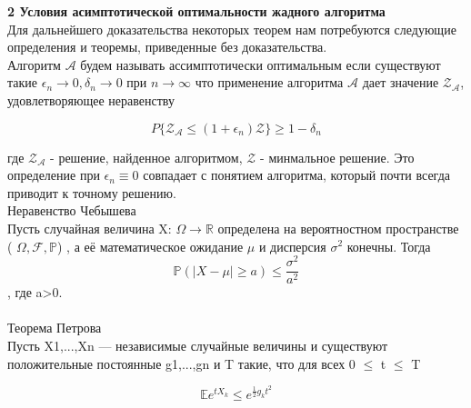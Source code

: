 \documentclass[a4paper, 14pt]{extarticle}
\begin{document}
\newcommand{\algorithm}{$\mathcal{A'}$}
\newcommand{\topboundE}{$\mathcal{Z^*_{A'}}$}
\newcommand{\topboundD}{$\mathcal{D^*_{A'}}$}
\newcommand{\randomvalue}{$\mathcal{Z_{A'}}$}
\newcommand{\randomvalueE}{$E(\text{\randomvalue})$}
\newcommand{\randomvalueD}{$D(\text{\randomvalue})$}

\textbf{2 Условия асимптотической оптимальности жадного алгоритма}\\

Для дальнейшего доказательства некоторых теорем нам потребуются следующие определения и теоремы, приведенные без доказательства.\\


Алгоритм $\mathcal{A}$ будем называть ассимптотически оптимальным если существуют такие $\epsilon_n \rightarrow 0, \delta_n \rightarrow 0$ при $n \rightarrow \infty$ что применение алгоритма $\mathcal{A}$ дает значение  $\mathcal{Z_A}$, удовлетворяющее неравенству
 
\begin{equation}\label{1}
P\{\mathcal{Z_A} \leq (1+\epsilon_n)\mathcal{Z}\}\geq 1-\delta_n
\end{equation}

где $\mathcal{Z_A}$ - решение, найденное алгоритмом, $\mathcal{Z}$ - минмальное решение.
Это определение при $\epsilon_n \equiv 0$ совпадает с понятием алгоритма, который почти всегда приводит к точному решению. \\


Неравенство Чебышева \\

Пусть случайная величина X: $\Omega\rightarrow\mathbb {R}$ определена на вероятностном пространстве ( $\Omega,{\mathcal {F}},\mathbb {P} $)
, а её математическое ожидание $\mu$ и дисперсия  $\sigma ^{2}$ конечны. Тогда 
\begin{equation}
{\mathbb {P}}\left(|X-\mu |\geqslant a\right)\leqslant {\frac {\sigma ^{2}}{a^{2}}}
\end{equation},
где  a>0. \\ \\


Теорема Петрова \\

Пусть X1,...,Xn — независимые случайные величины и
существуют положительные постоянные g1,...,gn и T такие, что для всех 0 $\leq$ t $\leq$ T

\begin{equation}
\mathbb {E}e^{tX_k} \leq e^{\frac{1}{2} g_k t^{2}}
\end{equation}
\end{document}
